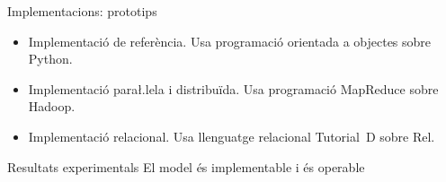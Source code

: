 \begin{frame}{Implementacions: prototips}

  \begin{itemize}
  \item Implementació de referència. Usa programació orientada a
    objectes sobre Python.
  \item Implementació para\l.lela i distribuïda. Usa programació MapReduce sobre Hadoop.
  \item Implementació relacional. Usa llenguatge relacional Tutorial~D sobre Rel.
  \end{itemize}


\begin{block}{Resultats experimentals}
El model és implementable i és operable
\end{block}


\end{frame}


